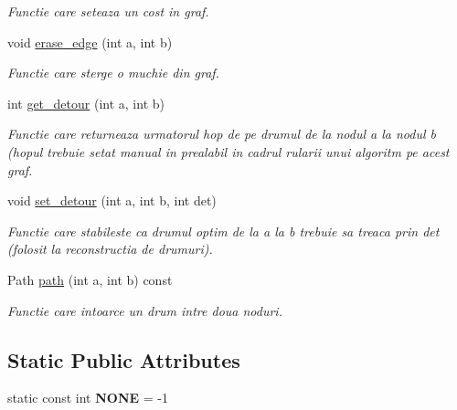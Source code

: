 \begin{DoxyCompactItemize}
\begin{DoxyCompactList}\small\item\em Functie care seteaza un cost in graf. \end{DoxyCompactList}\item 
\hypertarget{classGraphAdjMat_ab3a00134d8c219cba150c624850b3b41}{
void \hyperlink{classGraphAdjMat_ab3a00134d8c219cba150c624850b3b41}{erase\_\-edge} (int a, int b)}
\label{classGraphAdjMat_ab3a00134d8c219cba150c624850b3b41}

\begin{DoxyCompactList}\small\item\em Functie care sterge o muchie din graf. \end{DoxyCompactList}\item 
\hypertarget{classGraphAdjMat_a81e6304b47eee06cd873a9c6c81e8883}{
int \hyperlink{classGraphAdjMat_a81e6304b47eee06cd873a9c6c81e8883}{get\_\-detour} (int a, int b)}
\label{classGraphAdjMat_a81e6304b47eee06cd873a9c6c81e8883}

\begin{DoxyCompactList}\small\item\em Functie care returneaza urmatorul hop de pe drumul de la nodul a la nodul b (hopul trebuie setat manual in prealabil in cadrul rularii unui algoritm pe acest graf. \end{DoxyCompactList}\item 
\hypertarget{classGraphAdjMat_ac4b58b9abab3a1206bc2b6410fa7c42b}{
void \hyperlink{classGraphAdjMat_ac4b58b9abab3a1206bc2b6410fa7c42b}{set\_\-detour} (int a, int b, int det)}
\label{classGraphAdjMat_ac4b58b9abab3a1206bc2b6410fa7c42b}

\begin{DoxyCompactList}\small\item\em Functie care stabileste ca drumul optim de la a la b trebuie sa treaca prin det (folosit la reconstructia de drumuri). \end{DoxyCompactList}\item 
Path \hyperlink{classGraphAdjMat_ae1becbc6072af4aafc0c929e50cb18c1}{path} (int a, int b) const 
\begin{DoxyCompactList}\small\item\em Functie care intoarce un drum intre doua noduri. \end{DoxyCompactList}\end{DoxyCompactItemize}
\subsection*{Static Public Attributes}
\begin{DoxyCompactItemize}
\item 
\hypertarget{classGraphAdjMat_a6d54bba8160edf78df0a01851553a9e6}{
static const int {\bfseries NONE} = -\/1}
\label{classGraphAdjMat_a6d54bba8160edf78df0a01851553a9e6}

\end{DoxyCompactItemize}
